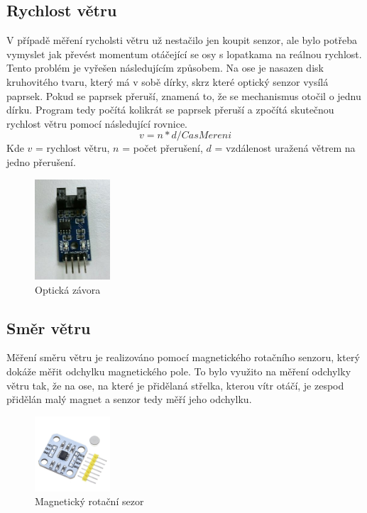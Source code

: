 \subsection{Rychlost větru}
V případě měření rycholsti větru už nestačilo jen koupit senzor, ale bylo potřeba vymyslet jak převést momentum otáčející se osy s lopatkama na reálnou rychlost.
Tento problém je vyřešen následujícím způsobem. Na ose je nasazen disk kruhovitého tvaru, který má v sobě dírky, skrz které optický senzor vysílá paprsek. Pokud se paprsek přeruší,
znamená to, že se mechanismus otočil o jednu dírku. Program tedy počítá kolikrát se paprsek přeruší a zpočítá skutečnou rychlost větru pomocí následující rovnice.
\begin{equation}
v = n * d / CasMereni 
\end{equation}
Kde $v$ = rychlost větru, $n$ = počet přerušení, $d$ = vzdálenost uražená větrem na jedno přerušení.

\begin{figure}[h] 
    \centering
    \includegraphics[width=0.25\textwidth]{images/ir_sensor.png}
    \caption{Optická závora}
\end{figure}

\subsection{Směr větru}
Měření směru větru je realizováno pomocí magnetického rotačního senzoru, který dokáže měřit odchylku magnetického pole. To bylo využito na měření odchylky větru tak, že na ose, na které je přidělaná střelka, kterou vítr otáčí, je zespod přidělán
malý magnet a senzor tedy měří jeho odchylku.

\begin{figure}[h] 
    \centering
    \includegraphics[width=0.25\textwidth]{images/AS5600.jpg}
    \caption{Magnetický rotační sezor}
\end{figure}

